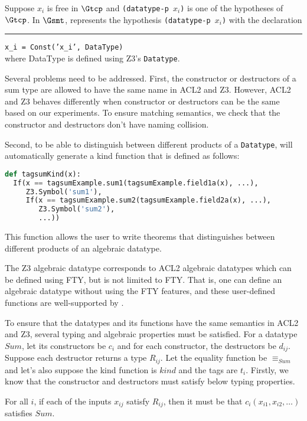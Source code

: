 Suppose $x_i$ is free in $\Gtcp$ and \texttt{(datatype-p $x_i$)} is one of
the hypotheses of $\Gtcp$. In $\Gsmt$, \smtlink{} represents the hypothesis
\texttt{(datatype-p $x_i$)} with the declaration\\
\rule{2em}{0ex}\texttt{x\_i = Const('x\_i', DataType)}\\
where DataType is defined using Z3's \texttt{Datatype}.

Several problems need to be addressed. First, the constructor or destructors of
a sum type are allowed to have the same name in ACL2 and Z3. However, ACL2 and
Z3 behaves differently when constructor or destructors can be the same based on
our experiments. To ensure matching semantics, we check that the constructor and
destructors don't have naming collision.

Second, to be able to distinguish between different products of a
\texttt{Datatype}, \smtlink{} will automatically generate a kind function that
is defined as follows:
\begin{lstlisting}[language=Python]
def tagsumKind(x):
  If(x == tagsumExample.sum1(tagsumExample.field1a(x), ...),
     Z3.Symbol('sum1'),
     If(x == tagsumExample.sum2(tagsumExample.field2a(x), ...),
        Z3.Symbol('sum2'),
        ...))
\end{lstlisting}
This function allows the user to write theorems that distinguishes between
different products of an algebraic datatype.

The Z3 algebraic datatype corresponds to ACL2 algebraic datatypes which can be
defined using FTY, but is not limited to FTY. That is, one can define an
algebraic datatype without using the FTY features, and these user-defined
functions are well-supported by \smtlink{}.

To ensure that the datatypes and its functions have the same semantics in ACL2
and Z3, several typing and algebraic properties must be satisfied. For a datatype
$Sum$, let its constructors be $c_i$ and for each constructor, the destructors
be $d_{ij}$. Suppose each destructor returns a type $R_{ij}$. Let the equality
function be $\equiv_{Sum}$ and let's also suppose the kind function is $kind$
and the tags are $t_{i}$. Firstly, we know that the constructor and destructors
must satisfy below typing properties.

\begin{property}
  For all $i$, if each of the inputs $x_{ij}$ satisfy $R_{ij}$, then
  it must be that $c_i(x_{i1}, x_{i2}, \ldots)$ satisfies $Sum$.
\end{property}

